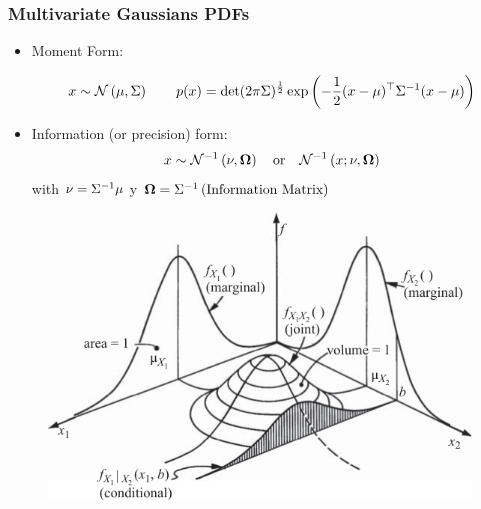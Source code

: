 \begin{frame}
    \frametitle{Multivariate Gaussians PDFs}
    
    \begin{itemize}
        \item Moment Form:        
        
        \begin{equation*}
            x \sim \mathcal{N}\left(\mu, \Sigma\right)  \qquad p(x)=\det(2\pi\Sigma)^{\frac{1}{2}} \exp\left(-\dfrac{1}{2} (x - \mu )^{\top} {\Sigma}^{-1} (x - \mu )  \right)
        \end{equation*}

        \item Information (or precision) form:
        \begin{equation*}
            x \sim {\mathcal{N}}^{-1}\left(\nu, \boldsymbol{\mathbf{\Omega}}\right) \quad \text{or} \quad {\mathcal{N}}^{-1}\left(x; \nu, \boldsymbol{\mathbf{\Omega}}\right)  
        \end{equation*}
        with
        $\nu = {\Sigma}^{-1} \mu$ y $\boldsymbol{\mathbf{\Omega}} = {\Sigma}^{-1} \, \text{(Information Matrix)}$
        
    \end{itemize}

    \begin{figure}[!h]
        \includegraphics[width=0.35\columnwidth]{./images/joint_marginal_and_conditional_probability_density_functions.pdf}
    \end{figure}
\end{frame}



